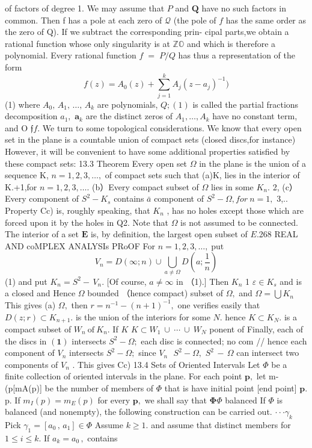 of factors of degree 1. We may assume that ${\mathbf{}}P$ and ${\boldsymbol{Q}}$ have no such factors in common. Then f has a pole at each zero of $\textstyle{\mathcal{Q}}$ (the pole of $\boldsymbol{\mathit{f}}$ has the same order as the zero of Q). If we subtract the corresponding prin- cipal parts,we obtain a rational function whose only singularity is at $\mathbb{Z}\mathbb{O}$ and which is therefore a polynomial. Every rational function $\scriptstyle f\;=\;P/Q$ has thus a representation of the form $$ f(z)=A_{0}(z)+\sum_{j=1}^{k}A_{j}(z-a_{j})^{-1}) $$ (1) where $A_{0},\,A_{1},\,\ldots,\,A_{k}$ are polynomials, $Q;(1)$ is called the partial fractions decomposition $a_{1},$ ${\boldsymbol{a}}_{k}$ are the distinct zeros of $A_{1},\ldots,A_{k}$ have no constant term, and O $\textstyle{\mathfrak{f}}f.$ We turn to some topological considerations. We know that every open set in the plane is a countable union of compact sets (closed discs,for instance) However, it will be convenient to have some additional properties satisfied by these compact sets: 13.3 Theorem Every open set $\Omega$ in the plane is the union of a sequence {K,} $n=1,2,3,\ldots,$ of compact sets such that (a)K, lies in the interior of K.+1,for $n=1,2,3,\ldots.$ (b）Every compact subset of $\Omega$ lies in some $K_{n}.$ 2, (c）Every component of $S^{2}-K_{s}$ contains $\bar{a}$ component of $S^{2}-\Omega,f o r\ n=1,$ 3,.. Property Cc) is, roughly speaking, that $K_{n}$ , has no holes except those which are forced upon it by the holes in Q2. Note that $\Omega$ is not assumed to be connected. The interior of a set $\boldsymbol{E}$ is, by definition, the largest open subset of $\textstyle E.$268 REAL AND coMPLEX ANALYSIs PRoOF For $n=1,2,3,\ldots,\operatorname{put}$ $$ V_{n}=D(\infty;n)\cup\bigcup_{a\neq\Omega}D\!\left(a;\frac{1}{n}\right) $$ (1) and put $K_{n}=S^{2}-\,V_{n}.$ [Of course, $a\neq\infty$ in （1).] Then $K_{n}$ 1 $\varepsilon\in K_{s}$ and is a closed and Hence $\Omega$ bounded （hence compact) subset of $\Omega,$ and $\Omega=\bigcup K_{n}$ This gives (a) $\Omega,$ then $r=n^{-1}-(n+1)^{-1},$ one verifies easily that $D(z;r)\subset K_{n+1}.$ is the union of the interiors for some $N.$ hence $K\subset K_{N}.$ is a compact subset of $W_{n}\ \mathrm{of}\ K_{n}.$ If $K$ $K\subset W_{1}\ \cup\ \cdots\ \cup\ W_{N}$ ponent of Finally, each of the discs in $\mathbf{(1)}$ intersects $S^{2}-\Omega;$ each disc is connected; no com // hence each component of ${\mathit{V}}_{n}$ intersects $S^{2}-\Omega;$ since $V_{n}\ {\ {\ {S}}^{2}}-\Omega,$ $\scriptstyle S^{2}\,-\,\Omega$ can intersect two components of ${\mathit{V}}_{n}$ . This gives Cc) 13.4 Sets of Oriented Intervals Let $\Phi$ be a finite collection of oriented intervals in the plane. For each point ${\boldsymbol{p}},$ let m-(p[mA(p)] be the number of members of $\Phi$ that is have initial point [end point] ${\boldsymbol{p}}.$ p. If $m_{I}(p)=m_{E}(p)$ for every ${\boldsymbol{p}},$ we shall say that $\mathbf{\Phi}\Phi$ balanced If $\Phi$ is balanced (and nonempty), the following construction can be carried out. $\textstyle\cdot\cdot\cdot\gamma_{k}$ Pick $\gamma_{1}=\left[a_{0}\,,\,a_{1}\right]\in\Phi$ Assume $k\geq1.$ and assume that distinct members for $1\leq i\leq k.$ If $a_{k}=a_{0}\,,$ contains 